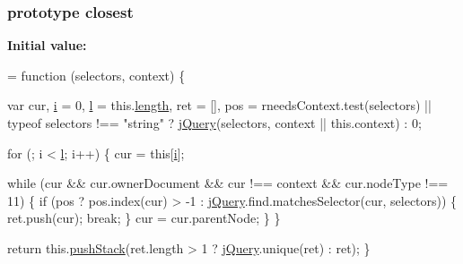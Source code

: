 \subsubsection[{\texorpdfstring{closest}{closest}}]{ {\bf prototype} closest}\hypertarget{jquery-2_82_81-vsdoc_8js_aff450c9c255a1867a5677efa5bed8765}{}\label{jquery-2_82_81-vsdoc_8js_aff450c9c255a1867a5677efa5bed8765}
{\bfseries Initial value\+:}
\begin{DoxyCode}
= \textcolor{keyword}{function} (selectors, context) \{
        

        var cur,
            \hyperlink{geolocation-marker_8js_a0325b7ce0988782a8032e720ef3aa411}{i} = 0,
            \hyperlink{geolocation-marker_8js_ae5e71a2600e8891c54854be157cc6626}{l} = this.\hyperlink{jquery-2_82_81-vsdoc_8js_aa7de35d58da66d9944ab9cbe82c19640}{length},
            ret = [],
            pos = rneedsContext.test(selectors) || typeof selectors !== \textcolor{stringliteral}{"string"} ?
                \hyperlink{jquery-2_82_81-vsdoc_8js_add5237586d970a38a81f990e8eb28c6c}{jQuery}(selectors, context || this.context) :
                0;

        \textcolor{keywordflow}{for} (; i < \hyperlink{geolocation-marker_8js_ae5e71a2600e8891c54854be157cc6626}{l}; i++) \{
            cur = \textcolor{keyword}{this}[\hyperlink{geolocation-marker_8js_a0325b7ce0988782a8032e720ef3aa411}{i}];

            \textcolor{keywordflow}{while} (cur && cur.ownerDocument && cur !== context && cur.nodeType !== 11) \{
                \textcolor{keywordflow}{if} (pos ? pos.index(cur) > -1 : \hyperlink{jquery-2_82_81-vsdoc_8js_add5237586d970a38a81f990e8eb28c6c}{jQuery}.find.matchesSelector(cur, selectors)) \{
                    ret.push(cur);
                    \textcolor{keywordflow}{break};
                \}
                cur = cur.parentNode;
            \}
        \}

        \textcolor{keywordflow}{return} this.\hyperlink{jquery-2_82_81-vsdoc_8js_afc3a7db1ef2b526338c06c07cecccd44}{pushStack}(ret.length > 1 ? \hyperlink{jquery-2_82_81-vsdoc_8js_add5237586d970a38a81f990e8eb28c6c}{jQuery}.unique(ret) : ret);
    \}
\end{DoxyCode}

